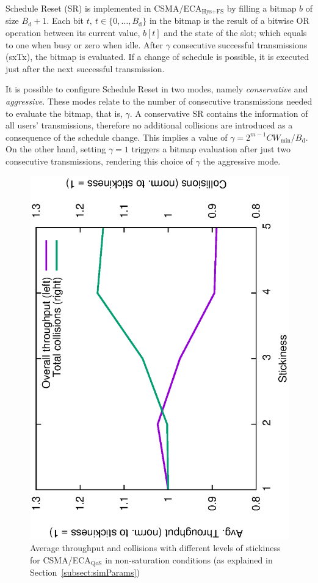 Schedule Reset (SR) is implemented in CSMA/ECA$_{\text{Hys+FS}}$ by filling a bitmap $b$ of size $B_{\text{d}}+1$. Each bit $t,~t\in\{0,\ldots ,B_{\text{d}}\}$ in the bitmap is the result of a bitwise OR operation between its current value, $b[t]$ and the state of the slot; which equals to one when busy or zero when idle. After $\gamma$ consecutive successful transmissions (sxTx), the bitmap is evaluated. If a change of schedule is possible, it is executed just after the next successful transmission.

It is possible to configure Schedule Reset in two modes, namely \emph{conservative} and \emph{aggressive}. These modes relate to the number of consecutive transmissions needed to evaluate the bitmap, that is, $\gamma$. A conservative SR contains the information of all users' transmissions, therefore no additional collisions are introduced as a consequence of the schedule change. This implies a value of $\gamma=2^{m-1}CW_{\min}/B_{\text{d}}$. On the other hand, setting $\gamma=1$ triggers a bitmap evaluation after just two consecutive transmissions, rendering this choice of $\gamma$ the aggressive mode.

\begin{figure}[tb]
	\centering
		\includegraphics[width=0.7\linewidth, angle=-90]{figures/stickEv-throughput-overallOnly.eps}
		\caption{Average throughput and collisions with different levels of stickiness for CSMA/ECA$_{\text{QoS}}$ in non-saturation conditions (as explained in Section~\ref{subsect:simParams})}
		\label{fig:stickEv-throughput-overallOnly}
	\end{figure}

